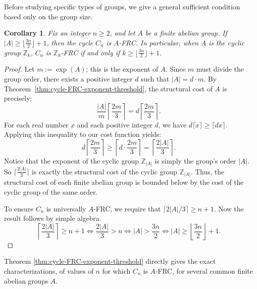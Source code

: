 \documentclass[a4paper,12pt]{article}
\theoremstyle{plain}
\newtheorem{corollary}[theorem]{Corollary}
\theoremstyle{definition}
\newcommand{\Z}{\mathbb{Z}}
\renewcommand\ge\geqslant
\def\aftermath{\par\vspace{-\belowdisplayskip}\vspace{-\parskip}\vspace{-\baselineskip}}
\begin{document}
Before studying specific types of groups, we give a general sufficient condition based only on the group size.

\begin{corollary}\label{cor:universal-sufficient}
    Fix an integer $n \ge 2$, and let $A$ be a finite abelian group. If $|A| \ge \lfloor \frac{3n}{2} \rfloor + 1$, then the cycle $C_n$ is $A$-FRC. In particular, when $A$ is the cyclic group $\mathbb{Z}_k$, $C_n$ is $\mathbb{Z}_k$-FRC if and only if $k \ge \lfloor \frac{3n}{2} \rfloor + 1$.
\end{corollary}

\begin{proof}
    Let $m:= \exp(A)$; this is the exponent of $A$. Since $m$ must divide the group order, there exists a positive integer $d$ such that $|A| = d \cdot m$. By Theorem~\ref{thm:cycle-FRC-exponent-threshold}, the structural cost of $A$ is precisely:
    \[\frac{|A|}{m} \left\lceil \frac{2m}{3} \right\rceil = d \left\lceil \frac{2m}{3} \right\rceil. \]
    For each real number $x$ and each positive integer $d$, 
    we have $d \lceil x \rceil \ge \lceil dx \rceil$. Applying this inequality to our cost function yields:
    \[ d \left\lceil \frac{2m}{3} \right\rceil \ge \left\lceil d \cdot \frac{2m}{3} \right\rceil = \left\lceil \frac{2|A|}{3} \right\rceil. \]
    Notice that the exponent of the cyclic group $\Z_{|A|}$ is simply the group's order $|A|$.  So $\lceil \frac{2|A|}{3} \rceil$ is exactly the structural cost of the cyclic group $\mathbb{Z}_{|A|}$. Thus, the structural cost of each finite abelian group is bounded below by the cost of the cyclic group of the same order. 
    
    To ensure $C_n$ is universally $A$-FRC, we require that $\lceil 2|A|/3\rceil \ge n+1$.
    Now the result follows by simple algebra.
    \[ \left\lceil \frac{2|A|}{3} \right\rceil \ge n+1 
    \iff \frac{2|A|}{3} > n 
    \iff |A| > \frac{3n}{2} 
    \iff |A| \ge \left\lfloor \frac{3n}{2} \right\rfloor + 1. \]
    \aftermath
\end{proof}
\bigskip

Theorem \ref{thm:cycle-FRC-exponent-threshold} directly gives the exact characterizations, of values of $n$ for which $C_n$ is $A$-FRC, for several common finite abelian groups $A$.
\end{document}
